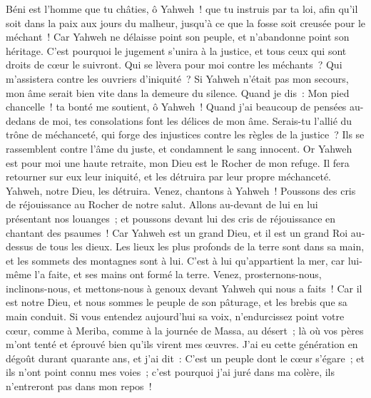 \begin{multicols}{2}
Béni est l'homme que tu châties, ô Yahweh~! que tu instruis par ta loi,
afin qu'il soit dans la paix aux jours du malheur, jusqu'à ce que la fosse soit creusée pour le méchant~!
Car Yahweh ne délaisse point son peuple, et n'abandonne point son héritage.
C'est pourquoi le jugement s'unira à la justice, et tous ceux qui sont droits de cœur le suivront.
Qui se lèvera pour moi contre les méchants~? Qui m'assistera contre les ouvriers d'iniquité~?
Si Yahweh n'était pas mon secours, mon âme serait bien vite dans la demeure du silence.
Quand je dis~: Mon pied chancelle~! ta bonté me soutient, ô Yahweh~!
Quand j'ai beaucoup de pensées au-dedans de moi, tes consolations font les délices de mon âme.
Serais-tu l'allié du trône de méchanceté, qui forge des injustices contre les règles de la justice~?
Ils se rassemblent contre l'âme du juste, et condamnent le sang innocent.
Or Yahweh est pour moi une haute retraite, mon Dieu est le Rocher de mon refuge.
Il fera retourner sur eux leur iniquité, et les détruira par leur propre méchanceté. Yahweh, notre Dieu, les détruira.
\VerseOne{}Venez, chantons à Yahweh~! Poussons des cris de réjouissance au Rocher de notre salut.
Allons au-devant de lui en lui présentant nos louanges~; et poussons devant lui des cris de réjouissance en chantant des psaumes~!
Car Yahweh est un grand Dieu, et il est un grand Roi au-dessus de tous les dieux.
Les lieux les plus profonds de la terre sont dans sa main, et les sommets des montagnes sont à lui.
C'est à lui qu'appartient la mer, car lui-même l'a faite, et ses mains ont formé la terre.
Venez, prosternons-nous, inclinons-nous, et mettons-nous à genoux devant Yahweh qui nous a faits~!
Car il est notre Dieu, et nous sommes le peuple de son pâturage, et les brebis que sa main conduit. Si vous entendez aujourd'hui sa voix,
n'endurcissez point votre cœur, comme à Meriba, comme à la journée de Massa, au désert~;
là où vos pères m'ont tenté et éprouvé bien qu'ils virent mes œuvres.
J'ai eu cette génération en dégoût durant quarante ans, et j'ai dit~: C'est un peuple dont le cœur s'égare~; et ils n'ont point connu mes voies~;
c'est pourquoi j'ai juré dans ma colère, ils n'entreront pas dans mon repos~!

\end{multicols}

